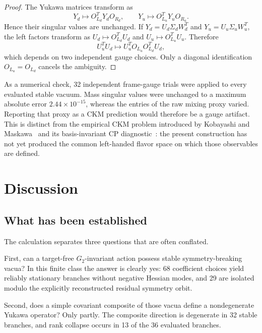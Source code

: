 \documentclass[11pt]{article}
\begin{document}
\begin{proof}
The Yukawa matrices transform as
\begin{equation}
  Y_d\mapsto O_{L_d}^TY_dO_{R_d},
  \qquad
  Y_u\mapsto O_{L_u}^TY_uO_{R_u}.
\end{equation}
Hence their singular values are unchanged.  If $Y_d=U_d\Sigma_dW_d^T$ and $Y_u=U_u\Sigma_uW_u^T$, the left factors transform as $U_d\mapsto O_{L_d}^TU_d$ and $U_u\mapsto O_{L_u}^TU_u$.  Therefore
\begin{equation}
  U_u^TU_d\mapsto U_u^TO_{L_u}O_{L_d}^TU_d,
\end{equation}
which depends on two independent gauge choices.  Only a diagonal identification $O_{L_u}=O_{L_d}$ cancels the ambiguity.
\end{proof}

As a numerical check, 32 independent frame-gauge trials were applied to every evaluated stable vacuum.  Mass singular values were unchanged to a maximum absolute error $2.44\times10^{-15}$, whereas the entries of the raw mixing proxy varied.  Reporting that proxy as a CKM prediction would therefore be a gauge artifact.  This is distinct from the empirical CKM problem introduced by Kobayashi and Maskawa~\cite{KobayashiMaskawa1973} and its basis-invariant CP diagnostic~\cite{Jarlskog1985}: the present construction has not yet produced the common left-handed flavor space on which those observables are defined.

\section{Discussion}

\subsection{What has been established}

The calculation separates three questions that are often conflated.

First, can a target-free $G_2$-invariant action possess stable symmetry-breaking vacua?  In this finite class the answer is clearly yes: 68 coefficient choices yield reliably stationary branches without negative Hessian modes, and 29 are isolated modulo the explicitly reconstructed residual symmetry orbit.

Second, does a simple covariant composite of those vacua define a nondegenerate Yukawa operator?  Only partly.  The composite direction is degenerate in 32 stable branches, and rank collapse occurs in 13 of the 36 evaluated branches.
\end{document}
